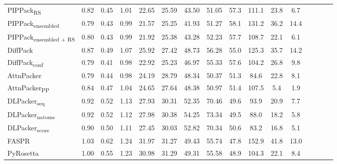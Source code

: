 \begin{table}
{\begin{tabular}{@{}lccccccccccccccc@{}}
                \textnormal{\hspace{0.5cm}PIPPack\textsubscript{RS}} & 0.82 & 0.45 & 1.01 & 22.65 & 25.59 & 43.50 & 51.05 & 57.3 & 111.1 & 23.8 & 6.7 \\
                \textnormal{\hspace{0.5cm}PIPPack\textsubscript{ensembled}} & 0.79 & 0.43 & 0.99 & 21.57 & 25.25 & 41.93 & 51.27 & 58.1 & 131.2 & 36.2 & 14.4 \\
                \textnormal{\hspace{0.5cm}PIPPack\textsubscript{ensembled + RS}} & 0.80 & 0.43 & 0.99 & 21.92 & 25.38 & 43.28 & 52.23 & 57.7 & 108.7 & 22.1 & 6.1 \\
                \textnormal{\hspace{0.5cm}DiffPack} & 0.87 & 0.49 & 1.07 & 25.92 & 27.42 & 48.73 & 56.28 & 55.0 & 125.3 & 35.7 & 14.2 \\
                \textnormal{\hspace{0.5cm}DiffPack\textsubscript{conf}} & 0.79 & 0.41 & 0.98 & 22.92 & 25.23 & 46.97 & 55.33 & 57.6 & 104.2 & 26.8 & 9.8 \\
                \textnormal{\hspace{0.5cm}AttnPacker} & 0.79 & 0.44 & 0.98 & 24.19 & 28.79 & 48.34 & 50.37 & 51.3 & 84.6 & 22.8 & 8.1 \\
                \textnormal{\hspace{0.5cm}AttnPacker\textsubscript{PP}} & 0.84 & 0.47 & 1.04 & 24.65 & 27.64 & 48.38 & 50.97 & 51.4 & 107.5 & 5.4 & 1.9 \\
                \textnormal{\hspace{0.5cm}DLPacker\textsubscript{seq}} & 0.92 & 0.52 & 1.13 & 27.93 & 30.31 & 52.35 & 70.46 & 49.6 & 93.9 & 20.9 & 7.7 \\
                \textnormal{\hspace{0.5cm}DLPacker\textsubscript{natoms}} & 0.92 & 0.52 & 1.12 & 27.98 & 30.38 & 54.25 & 73.34 & 49.5 & 88.0 & 18.2 & 5.8 \\
                \textnormal{\hspace{0.5cm}DLPacker\textsubscript{score}} & 0.90 & 0.50 & 1.11 & 27.45 & 30.03 & 52.82 & 70.34 & 50.6 & 83.2 & 16.8 & 5.1 \\
                \textnormal{\hspace{0.5cm}FASPR} & 1.03 & 0.62 & 1.24 & 31.97 & 31.27 & 49.43 & 55.74 & 47.8 & 152.9 & 41.8 & 13.0 \\
                \textnormal{\hspace{0.5cm}PyRosetta} & 1.00 & 0.55 & 1.23 & 30.98 & 31.29 & 49.31 & 55.58 & 48.9 & 104.3 & 22.1 & 8.4 \\

\end{tabular}}
\end{table}

